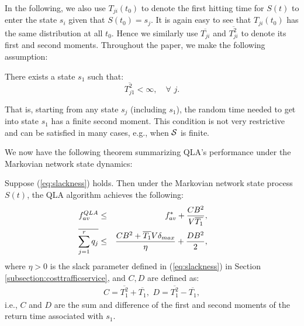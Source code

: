 \documentclass[journal]{IEEEtran}
\newcommand{\script}[1]{{{\cal{#1} }}}
\begin{document}
In the following, we also use $T_{ji}(t_0)$ to denote the first hitting time for $S(t)$ to enter the state $s_i$ given that $S(t_0)=s_j$. It is again easy to see that $T_{ji}(t_0)$ has the same distribution at all $t_0$. Hence we similarly use $\overline{T_{ji}}$ and $\overline{T_{ji}^2}$ to denote its first and second moments. 
Throughout the paper, we make the following assumption:
\begin{assumption}\label{assumption:finitereturn}
There exists a state $s_1$ such that: \[\overline{T_{j1}^2}<\infty,\quad\forall\,\, j.\] 
\end{assumption}
That is, starting from any state $s_j$ (including $s_1$), the random time needed to get into state $s_1$ has a finite second moment. 
This condition is not very restrictive and can be satisfied in many cases, e.g., when $\script{S}$ is finite. 


We now have the following theorem summarizing QLA's performance under the Markovian network state dynamics:
\begin{thm}\label{thm:generalq}
Suppose (\ref{eq:slackness}) holds. Then 
under the Markovian network state process $S(t)$, the QLA algorithm achieves the following:
\begin{eqnarray}
\hspace{-.3in}f^{QLA}_{av}&\leq& f^*_{av}+\frac{CB^2}{V\overline{T_1}},\label{eq:qla_utility}\\
\hspace{-.3in}\overline{\sum_{j=1}^rq_j} &\leq& \frac{CB^2 + \overline{T_1}V\delta_{max}}{ \eta} +\frac{DB^2}{2}, \label{eq:qla_backlog}
\end{eqnarray}
where $\eta>0$ is the slack parameter defined in (\ref{eq:slackness}) in Section \ref{subsection:costtrafficservice}, and $C, D$ are defined as:  
\begin{eqnarray}
C=\overline{T^2_1}+\overline{T_1},\,\,
D=\overline{T^2_1}-\overline{T_1},\label{eq:max_returnmoment_def}
\end{eqnarray}
i.e., $C$ and $D$ are the sum and difference of the first and second moments of the return time associated with $s_1$.
\end{thm}
\end{document}
